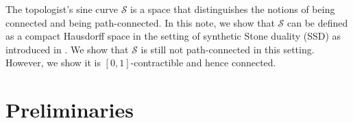 
The topologist's sine curve $\mathcal S$ is a space that distinguishes the notions of being connected and being path-connected. In this note, we show that $\mathcal S$ can be defined as a compact Hausdorff space in the setting of synthetic Stone duality (SSD) as introduced in \cite{synthetic-stone-duality}. 
We show that $\mathcal S$ is still not path-connected in this setting. However, we show it is $[0,1]$-contractible and hence connected. 


\section{Preliminaries}



\appendix

\printbibliography
